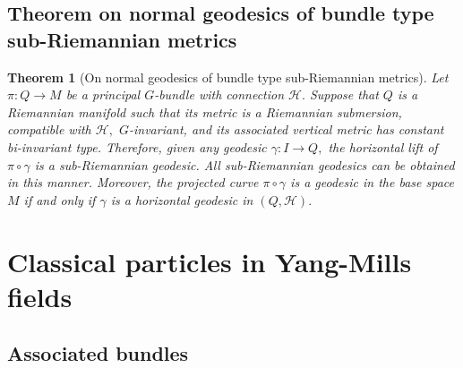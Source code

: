 \documentclass [xcolor=svgnames, t] {beamer}
\theoremstyle{definition}
\theoremstyle{plain}
\newtheorem{thm}{Theorem}
\theoremstyle{remark}
\begin{document}
\subsection{Theorem on normal geodesics of bundle type sub-Riemannian metrics}%
\label{sub:theorem_on_normal_geodesics_of_bundle_type_sub_riemannian_metrics}
\begin{frame}
\begin{thm}[On normal geodesics of bundle type sub-Riemannian metrics]\label{thm:normal_geodesics}
	Let $ \pi: Q \rightarrow M $ be a principal $ G $-bundle with connection $ \mathcal{H}. $ Suppose that $ Q $ is a Riemannian manifold such that its metric is a Riemannian submersion, compatible with $ \mathcal{H}, $ $ G $-invariant, and its associated vertical metric has constant bi-invariant type. Therefore, given any geodesic $\gamma: I \rightarrow Q, $ the horizontal lift of $ \pi\circ\gamma $ is a sub-Riemannian geodesic. All sub-Riemannian geodesics can be obtained in this manner. Moreover, the projected curve $ \pi\circ\gamma$ is a geodesic in the base space $ M $ if and only if $ \gamma $ is a horizontal geodesic in $ (Q, \mathcal{H}). $ 
\end{thm}
\end{frame}
\section[Yang-Mills]{Classical particles in Yang-Mills fields}%
\label{sec:classical_particles_in_yang_mills_fields}
\subsection{Associated bundles}%
\label{sub:associated_bundles}
\end{document}
